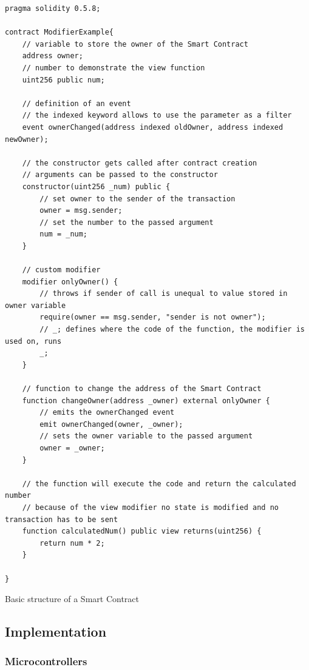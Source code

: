 \begin{listing}[H]
\begin{verbatim}
pragma solidity 0.5.8;

contract ModifierExample{
    // variable to store the owner of the Smart Contract
    address owner;
    // number to demonstrate the view function
    uint256 public num;
    
    // definition of an event
    // the indexed keyword allows to use the parameter as a filter
    event ownerChanged(address indexed oldOwner, address indexed newOwner);
    
    // the constructor gets called after contract creation
    // arguments can be passed to the constructor
    constructor(uint256 _num) public {
        // set owner to the sender of the transaction
        owner = msg.sender;
        // set the number to the passed argument
        num = _num;
    }
    
    // custom modifier
    modifier onlyOwner() {
        // throws if sender of call is unequal to value stored in owner variable
        require(owner == msg.sender, "sender is not owner");
        // _; defines where the code of the function, the modifier is used on, runs
        _;
    }
    
    // function to change the address of the Smart Contract
    function changeOwner(address _owner) external onlyOwner {
        // emits the ownerChanged event
        emit ownerChanged(owner, _owner);
        // sets the owner variable to the passed argument
        owner = _owner;
    }
    
    // the function will execute the code and return the calculated number
    // because of the view modifier no state is modified and no transaction has to be sent
    function calculatedNum() public view returns(uint256) {
        return num * 2;
    }
    
}
\end{verbatim}
\caption{Basic structure of a Smart Contract}
\label{lis:sc_basic_ref}
\end{listing}


\newpage
\subsection{Implementation}
\subsubsection{Microcontrollers}

